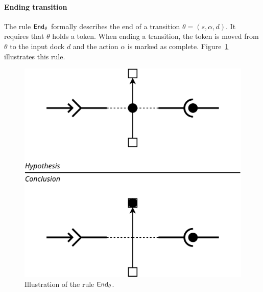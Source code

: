 \paragraph{Ending transition}{

The rule $\mathsf{End}_\theta$ formally describes the end of a transition
$\theta = (s, \alpha, d)$. It requires that $\theta$ holds a
token. When ending a transition, the token is moved from $\theta$ to
the input dock $d$ and the action $\alpha$ is marked as
complete. Figure~\ref{fig:r2} illustrates this rule.

\begin{figure}[t]
\begin{center}
  \includegraphics[width=0.55\columnwidth]{./images/ending_transition.pdf}
\end{center}
\caption{Illustration of the rule $\mathsf{End}_\theta$.}
\label{fig:r2}
\end{figure}
  
}


